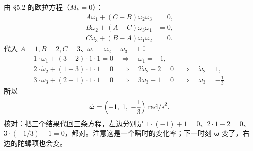 \documentclass[11pt]{ctexart}
\let\orighdr\hdr
\renewcommand{\hdr}[2]{\par\needspace{10\baselineskip}\orighdr{#1}{#2}}
\begin{document}
由 \S5.2 的欧拉方程（$M_k=0$）：
\[
\begin{aligned}
A\dot\omega_1+(C-B)\omega_2\omega_3&=0,\\
B\dot\omega_2+(A-C)\omega_3\omega_1&=0,\\
C\dot\omega_3+(B-A)\omega_1\omega_2&=0 .
\end{aligned}
\]
代入 $A=1,B=2,C=3$、$\omega_1=\omega_2=\omega_3=1$：
\begin{gather*}
1\cdot\dot\omega_1+(3-2)\cdot1\cdot1=0 \quad\Longrightarrow\quad \dot\omega_1=-1,\\
2\cdot\dot\omega_2+(1-3)\cdot1\cdot1=0 \quad\Longrightarrow\quad 2\dot\omega_2-2=0 \quad\Longrightarrow\quad \dot\omega_2=1,\\
3\cdot\dot\omega_3+(2-1)\cdot1\cdot1=0 \quad\Longrightarrow\quad 3\dot\omega_3+1=0 \quad\Longrightarrow\quad \dot\omega_3=-\frac13 .
\end{gather*}
所以
\[
\dot{\boldsymbol\omega}=\Bigl(-1,\;1,\;-\frac13\Bigr)\ \text{rad/s}^2 .
\]
核对：把三个结果代回三条方程，左边分别是 $1\cdot(-1)+1=0$、$2\cdot1-2=0$、$3\cdot(-1/3)+1=0$，都对。注意这是一个瞬时的变化率；下一时刻 $\boldsymbol\omega$ 变了，右边的陀螺项也会变。

\label{app:notation}

\end{document}
